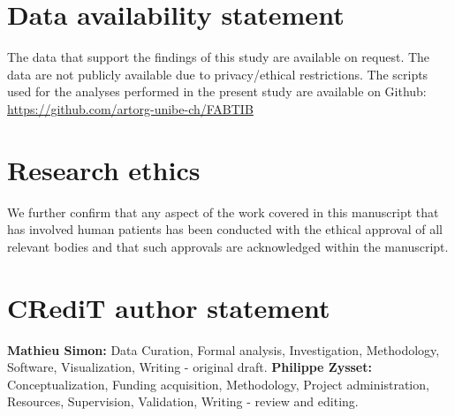 \documentclass[a4paper,fleqn]{DC_ArtStyle}
\begin{document}
	\section*{Data availability statement}
	The data that support the findings of this study are available on request. The data are not publicly available due to privacy/ethical restrictions. The scripts used for the analyses performed in the present study are available on Github: \url{https://github.com/artorg-unibe-ch/FABTIB}
	
	\section*{Research ethics}
	We further confirm that any aspect of the work covered in this manuscript that has involved human patients has been conducted with the ethical approval of all relevant bodies and that such approvals are acknowledged within the manuscript.
	
	\section*{CRediT author statement}
	\textbf{Mathieu Simon:} Data Curation, Formal analysis, Investigation, Methodology, Software, Visualization, Writing - original draft.
	\textbf{Philippe Zysset:} Conceptualization, Funding acquisition, Methodology, Project administration, Resources, Supervision, Validation, Writing - review and editing.
	

	\nocite{*}
	
	


	


	\clearpage
	\appendix
	
	
\end{document}
